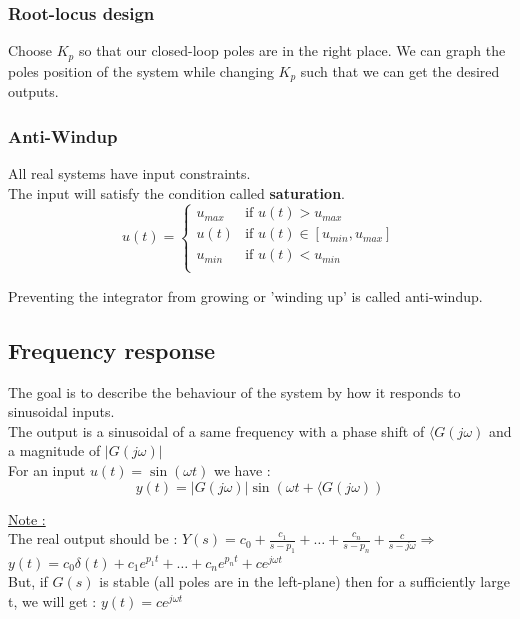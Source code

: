 \documentclass[../main.tex]{subfiles}
\begin{document}
\subsubsection{Root-locus design}
Choose $K_p$ so that our closed-loop poles are in the right place. We can graph the poles position of the system while changing $K_p$ such that we can get the desired outputs.\\

\subsubsection{Anti-Windup}
All real systems have input constraints.\\
The input will satisfy the condition called \textbf{saturation}.\begin{equation}
    u(t) = \begin{cases}
        u_{max} & \text{if } u(t)>u_{max}\\
        u(t) & \text{if } u(t) \in [u_{min}, u_{max}]\\
        u_{min} & \text{if } u(t) < u_{min}\\
    \end{cases}
\end{equation}

Preventing the integrator from growing or 'winding up' is called anti-windup.\\

\subsection{Frequency response}
The goal is to describe the behaviour of the system by how it responds to sinusoidal inputs.\\

\warning The output is a sinusoidal of a same frequency with a phase shift of $\langle G(j\omega)$ and a magnitude of $\lvert G(j\omega)\rvert$\\

For an input $u(t) = \sin(\omega t)$ we have : \\

\begin{equation}
    y(t) = \lvert G(j\omega)\rvert \sin(\omega t+ \langle G(j\omega))
\end{equation}

\quad \underline{Note :}\\
The real output should be : $Y(s) = c_0 + \frac{c_1}{s-p_1} + \dots + \frac{c_n}{s-p_n} + \frac{c}{s-j\omega} \Rightarrow$ $y(t) = c_0\delta(t) + c_1 e^{p_1t} + \dots + c_n e^{p_nt} + ce^{j\omega t}$\\
But, if $G(s)$ is stable (all poles are in the left-plane) then for a sufficiently large t, we will get : $y(t) = ce^{j\omega t}$\\
\end{document}
